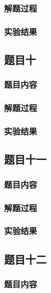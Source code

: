 \documentclass[11pt,a4paper]{ctexart}
\begin{document}
\subsubsection{解题过程}
\mbox{}

\subsubsection{实验结果}
\mbox{}

\subsection{题目十}
\subsubsection{题目内容}
\mbox{}

\subsubsection{解题过程}
\mbox{}

\subsubsection{实验结果}
\mbox{}

\subsection{题目十一}
\subsubsection{题目内容}
\mbox{}

\subsubsection{解题过程}
\mbox{}

\subsubsection{实验结果}
\mbox{}

\subsection{题目十二}
\subsubsection{题目内容}
\mbox{}
\end{document}
